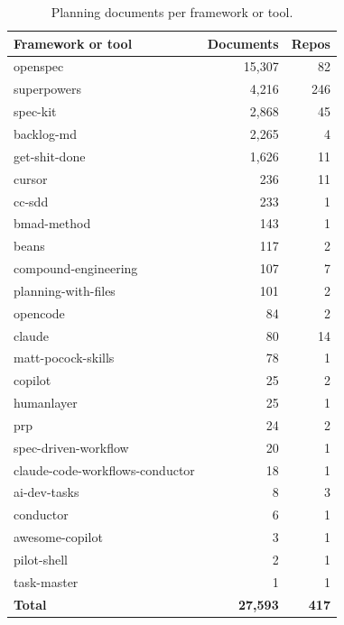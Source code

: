 \begin{table}[t]
\centering
\caption{Planning documents per framework or tool.}
\label{tab:planning-documents}
\begin{tabular}{lrr}
\toprule
\textbf{Framework or tool} & \textbf{Documents} & \textbf{Repos} \\
\midrule
openspec & 15,307 & 82 \\
superpowers & 4,216 & 246 \\
spec-kit & 2,868 & 45 \\
backlog-md & 2,265 & 4 \\
get-shit-done & 1,626 & 11 \\
cursor & 236 & 11 \\
cc-sdd & 233 & 1 \\
bmad-method & 143 & 1 \\
beans & 117 & 2 \\
compound-engineering & 107 & 7 \\
planning-with-files & 101 & 2 \\
opencode & 84 & 2 \\
claude & 80 & 14 \\
matt-pocock-skills & 78 & 1 \\
copilot & 25 & 2 \\
humanlayer & 25 & 1 \\
prp & 24 & 2 \\
spec-driven-workflow & 20 & 1 \\
claude-code-workflows-conductor & 18 & 1 \\
ai-dev-tasks & 8 & 3 \\
conductor & 6 & 1 \\
awesome-copilot & 3 & 1 \\
pilot-shell & 2 & 1 \\
task-master & 1 & 1 \\
\midrule
\textbf{Total} & \textbf{27,593} & \textbf{417} \\
\bottomrule
\end{tabular}
\end{table}
